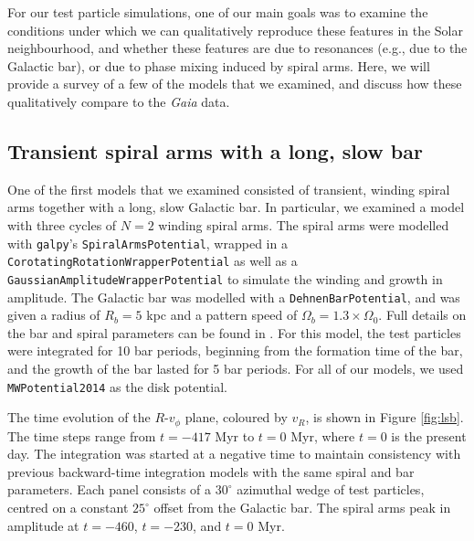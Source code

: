 \documentclass[10pt]{article}
\begin{document}
For our test particle simulations, one of our main goals was to examine the conditions under which we can qualitatively reproduce these features in the Solar neighbourhood, and whether these features are due to resonances (e.g., due to the Galactic bar), or due to phase mixing induced by spiral arms. Here, we will provide a survey of a few of the models that we examined, and discuss how these qualitatively compare to the \textit{Gaia} data.

\subsection{Transient spiral arms with a long, slow bar}
One of the first models that we examined consisted of transient, winding spiral arms together with a long, slow Galactic bar. In particular, we examined a model with three cycles of $N=2$ winding spiral arms. The spiral arms were modelled with \texttt{galpy}'s \texttt{SpiralArmsPotential}, wrapped in a \texttt{CorotatingRotationWrapperPotential} as well as a \texttt{GaussianAmplitudeWrapperPotential} to simulate the winding and growth in amplitude. The Galactic bar was modelled with a \texttt{DehnenBarPotential}, and was given a radius of $R_b = 5$ kpc and a pattern speed of $\Omega_b = 1.3 \times \Omega_0$. Full details on the bar and spiral parameters can be found in \textcite{hunt2019}. For this model, the test particles were integrated for 10 bar periods, beginning from the formation time of the bar, and the growth of the bar lasted for 5 bar periods. For all of our models, we used \texttt{MWPotential2014} as the disk potential.

The time evolution of the $R$-$v_\phi$ plane, coloured by $v_R$, is shown in Figure \ref{fig:lsb}. The time steps range from $t = -417$ Myr to $t = 0$ Myr, where $t = 0$ is the present day. The integration was started at a negative time to maintain consistency with previous backward-time integration models with the same spiral and bar parameters. Each panel consists of a $30^\circ$ azimuthal wedge of test particles, centred on a constant $25^\circ$ offset from the Galactic bar. The spiral arms peak in amplitude at $t = -460$, $t = -230$, and $t = 0$ Myr.
\end{document}
